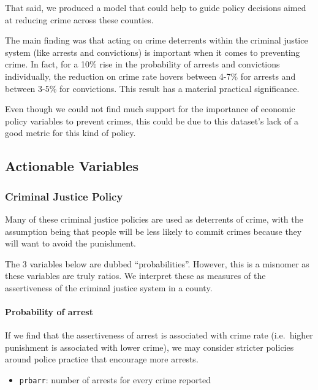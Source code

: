 \documentclass[]{article}
\providecommand{\tightlist}{%
  \setlength{\itemsep}{0pt}\setlength{\parskip}{0pt}}
\let\oldparagraph\paragraph
\renewcommand{\paragraph}[1]{\oldparagraph{#1}\mbox{}}
\begin{document}
That said, we produced a model that could help to guide policy decisions
aimed at reducing crime across these counties.

The main finding was that acting on crime deterrents within the criminal
justice system (like arrests and convictions) is important when it comes
to preventing crime. In fact, for a 10\% rise in the probability of
arrests and convictions individually, the reduction on crime rate hovers
between 4-7\% for arrests and between 3-5\% for convictions. This result
has a material practical significance.

Even though we could not find much support for the importance of
economic policy variables to prevent crimes, this could be due to this
dataset's lack of a good metric for this kind of policy.

\hypertarget{actionable-variables}{%
\subsection{Actionable Variables}\label{actionable-variables}}

\hypertarget{criminal-justice-policy}{%
\subsubsection{Criminal Justice Policy}\label{criminal-justice-policy}}

Many of these criminal justice policies are used as deterrents of crime,
with the assumption being that people will be less likely to commit
crimes because they will want to avoid the punishment.

The 3 variables below are dubbed ``probabilities''. However, this is a
misnomer as these variables are truly ratios. We interpret these as
measures of the assertiveness of the criminal justice system in a
county.

\hypertarget{probability-of-arrest}{%
\paragraph{Probability of arrest}\label{probability-of-arrest}}

If we find that the assertiveness of arrest is associated with crime
rate (i.e.~higher punishment is associated with lower crime), we may
consider stricter policies around police practice that encourage more
arrests.

\begin{itemize}
\tightlist
\item
  \texttt{prbarr}: number of arrests for every crime reported
\end{itemize}
\end{document}
